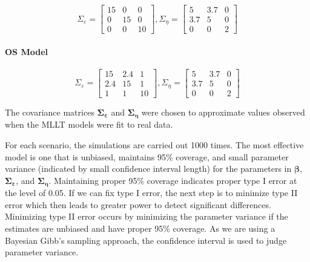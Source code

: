 \documentclass[
]{article}
\begin{document}
\begin{equation}\label{eq:S}
\Sigma_\varepsilon = 
\begin{bmatrix}
15 & 0 & 0\\
0 & 15 & 0\\
0 & 0 & 10
\end{bmatrix}, 
\Sigma_\eta =
\begin{bmatrix}
5 & 3.7 & 0\\
3.7 & 5 & 0\\
0 & 0 & 2
\end{bmatrix}
\end{equation}

\hypertarget{os-model}{%
\paragraph{OS Model}\label{os-model}}

\begin{equation}\label{eq:OS}
\Sigma_\varepsilon = 
\begin{bmatrix}
15 & 2.4 & 1\\
2.4 & 15 & 1\\
1 & 1 & 10
\end{bmatrix}, 
\Sigma_\eta =
\begin{bmatrix}
5 & 3.7 & 0\\
3.7 & 5 & 0\\
0 & 0 & 2
\end{bmatrix}
\end{equation}

The covariance matrices \(\boldsymbol{\Sigma_\varepsilon}\) and \(\boldsymbol{\Sigma_\eta}\) were chosen to approximate values observed when the MLLT models were fit to real data.

For each scenario, the simulations are carried out 1000 times. The most effective model is one that is unbiased, maintains 95\% coverage, and small parameter variance (indicated by small confidence interval length) for the parameters in \(\boldsymbol{\beta}\), \(\boldsymbol{\Sigma_\varepsilon}\), and \(\boldsymbol{\Sigma_\eta}\). Maintaining proper 95\% coverage indicates proper type I error at the level of 0.05. If we can fix type I error, the next step is to minimize type II error which then leads to greater power to detect significant differences. Minimizing type II error occurs by minimizing the parameter variance if the estimates are unbiased and have proper 95\% coverage. As we are using a Bayesian Gibb's sampling approach, the confidence interval is used to judge parameter variance.
\end{document}
